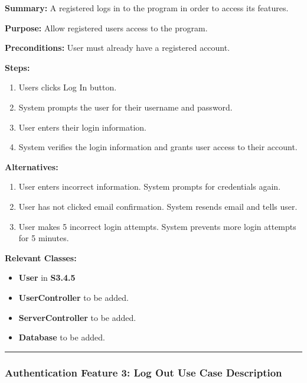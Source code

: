 \documentclass[twoside,letterpaper]{article}
\begin{document}
	\noindent\textbf{Summary:} A registered logs in to the program in order to access its features.  \newline
	
	\noindent\textbf{Purpose:} Allow registered users access to the program.  \newline
	
	\noindent\textbf{Preconditions:} User must already have a registered account.  \newline
	
	\noindent\textbf{Steps:}
	\begin{enumerate}
		\item Users clicks Log In button.
		\item System prompts the user for their username and password.
		\item User enters their login information.
		\item System verifies the login information and grants user access to their account.
	\end{enumerate}
	\noindent\textbf{Alternatives:}
		\begin{enumerate}
			\item User enters incorrect information. System prompts for credentials again.
			\item User has not clicked email confirmation. System resends email and tells user.
			\item User makes 5 incorrect login attempts. System prevents more login attempts for 5 minutes.
		\end{enumerate}
	
	\noindent\textbf{Relevant Classes:}
	\begin{itemize}
		\item \textbf{User} in \textbf{S3.4.5}
		\item \textbf{UserController} to be added.
		\item \textbf{ServerController} to be added.
		\item \textbf{Database} to be added.
	\end{itemize}
	\vspace{8pt}
	\hrule
	\newpage
	
	\subsubsection[Authentication Feature 3: Log Out Use Case Description]{\rmfamily\bfseries\color{black}
		Authentication Feature 3: Log Out Use Case Description}
		\label{a:uc3}
	\hypertarget{RefHeading22059017292}{}
	
\end{document}
